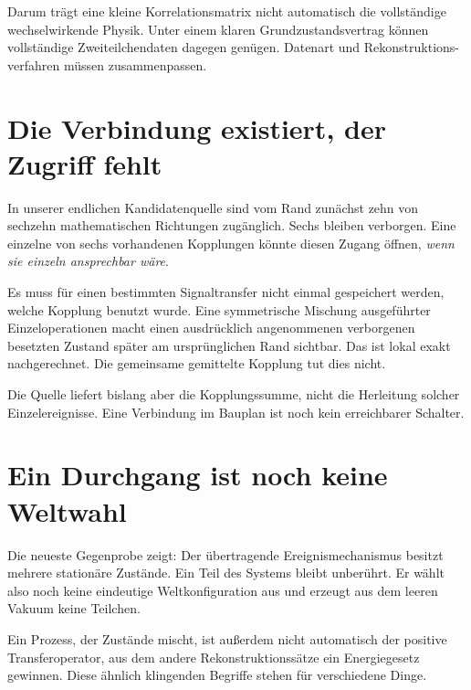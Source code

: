 Darum trägt eine kleine Korrelationsmatrix nicht automatisch die vollständige
wechselwirkende Physik. Unter einem klaren Grundzustandsvertrag können
vollständige Zweiteilchendaten dagegen genügen. Datenart und Rekonstruktions-
verfahren müssen zusammenpassen.

\section*{Die Verbindung existiert, der Zugriff fehlt}
In unserer endlichen Kandidatenquelle sind vom Rand zunächst zehn von
sechzehn mathematischen Richtungen zugänglich. Sechs bleiben verborgen.
Eine einzelne von sechs vorhandenen Kopplungen könnte diesen Zugang öffnen,
\emph{wenn sie einzeln ansprechbar wäre}.

Es muss für einen bestimmten Signaltransfer nicht einmal gespeichert werden,
welche Kopplung benutzt wurde. Eine symmetrische Mischung ausgeführter
Einzeloperationen macht einen ausdrücklich angenommenen verborgenen
besetzten Zustand später am ursprünglichen Rand sichtbar. Das ist lokal
exakt nachgerechnet. Die gemeinsame gemittelte Kopplung tut dies nicht.

Die Quelle liefert bislang aber die Kopplungssumme, nicht die Herleitung
solcher Einzelereignisse. Eine Verbindung im Bauplan ist noch kein
erreichbarer Schalter.

\section*{Ein Durchgang ist noch keine Weltwahl}
Die neueste Gegenprobe zeigt: Der übertragende Ereignismechanismus besitzt
mehrere stationäre Zustände. Ein Teil des Systems bleibt unberührt. Er
wählt also noch keine eindeutige Weltkonfiguration aus und erzeugt aus dem
leeren Vakuum keine Teilchen.

Ein Prozess, der Zustände mischt, ist außerdem nicht automatisch der positive
Transferoperator, aus dem andere Rekonstruktionssätze ein Energiegesetz
gewinnen. Diese ähnlich klingenden Begriffe stehen für verschiedene Dinge.

